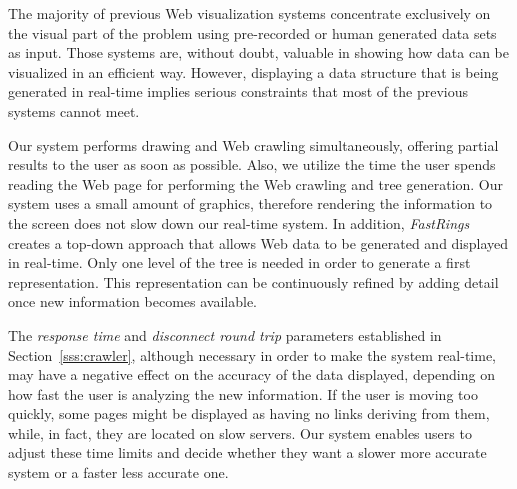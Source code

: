 \documentclass[]{article}
\begin{document}
{The majority of previous Web visualization systems concentrate exclusively on the visual part of the problem using pre-recorded or human generated data sets as input.
Those systems are, without doubt, valuable in showing how data can be visualized in an efficient way.
However, displaying a data structure that is being generated in real-time implies serious constraints that most of the previous systems cannot meet.


Our system performs drawing and Web crawling simultaneously, offering partial results to the user as soon as possible.
Also, we utilize the time the user spends reading the Web page for performing the Web crawling and tree generation.
Our system uses a small amount of graphics, therefore rendering the information to the screen does not slow down our real-time system.
In addition, {\em FastRings} creates a top-down approach that allows Web data to be generated and displayed in real-time.
Only one level of the tree is needed in order to generate a first representation.
This representation can be continuously refined by adding detail once new information becomes available.

The {\em response time} and {\em disconnect round trip} parameters established in Section~\ref{sss:crawler}, although necessary in order to make the system real-time, may have a negative effect on the accuracy of the data displayed, depending on how fast the user is analyzing the new information.  If the user is moving too quickly, some pages might be displayed as having no links deriving from them, while, in fact, they are located on slow servers.
Our system enables users to adjust these time limits and decide whether they want a slower more accurate system or a faster less accurate one.

}
\end{document}

